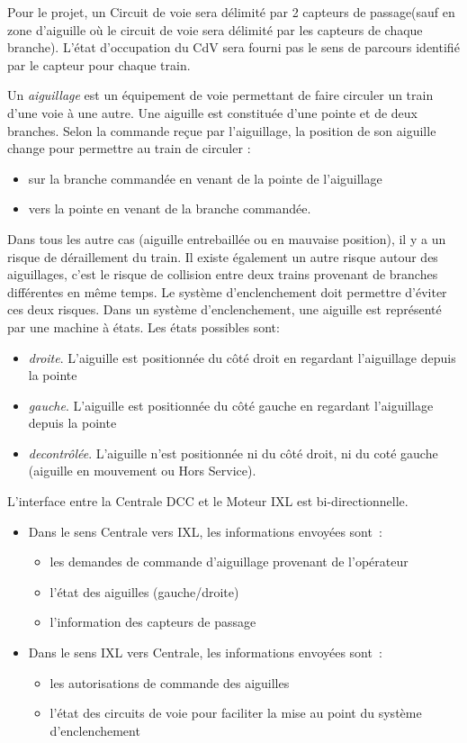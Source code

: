 \medskip
Pour le projet, un Circuit de voie sera délimité par 2 capteurs de
passage(sauf en zone d'aiguille où le circuit de voie sera délimité
par les capteurs de chaque branche). L'état d'occupation du CdV sera
fourni pas le sens de parcours identifié par le capteur pour chaque
train.

\medskip
Un \emph{aiguillage} est un équipement de voie permettant de faire
circuler un train d'une voie à une autre. Une aiguille est constituée
d'une pointe et de deux branches. Selon la commande reçue par
l'aiguillage, la position de son aiguille change pour permettre au train
de circuler :
\begin{itemize}
\item sur la branche commandée en venant de la pointe de l'aiguillage
\item vers la pointe en venant de la branche commandée. 
\end{itemize}

\medskip
Dans tous les autre cas (aiguille entrebaillée ou en mauvaise position), 
il y a un risque de déraillement du train. Il existe également un autre 
risque autour des aiguillages, c'est le risque de collision entre deux
trains provenant de branches différentes en même temps. Le système 
d'enclenchement doit permettre d'éviter ces deux risques.
Dans un système d'enclenchement, une aiguille est représenté par une 
machine à états. Les états possibles sont:

\begin{itemize}
\item \emph{droite}. L'aiguille est positionnée du côté droit en regardant
l'aiguillage depuis la pointe
\item \emph{gauche}. L'aiguille est positionnée du côté gauche en regardant
l'aiguillage depuis la pointe
\item \emph{decontrôlée}. L'aiguille n'est positionnée ni du côté droit, 
ni du coté gauche (aiguille en mouvement ou Hors Service).
\end{itemize}

\medskip
L'interface entre la Centrale DCC et le Moteur IXL est bi-directionnelle. 

\begin{itemize}
\item Dans le sens Centrale vers IXL, les informations envoyées sont~:
  \begin{itemize}
  \item les demandes de commande d'aiguillage provenant de l'opérateur
  \item l'état des aiguilles (gauche/droite)
  \item l'information des capteurs de passage
  \end{itemize}

\item Dans le sens IXL vers Centrale, les informations envoyées sont~:
  \begin{itemize}
  \item les autorisations de commande des aiguilles
  \item l'état des circuits de voie pour faciliter la mise au point 
  du système d'enclenchement
  \end{itemize}
\end{itemize}


